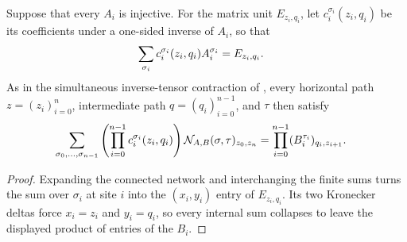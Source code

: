 \begin{lemma}
    \label{lem:mpug_inverse_contraction_open_alternating_network}
    \leanok
    Suppose that every $A_i$ is injective.  For the matrix unit $E_{z_i,q_i}$,
    let $c_i^{\sigma_i}(z_i,q_i)$ be its coefficients under a one-sided
    inverse of $A_i$, so that
    \begin{align}
        \sum_{\sigma_i}c_i^{\sigma_i}(z_i,q_i)A_i^{\sigma_i}
         & =E_{z_i,q_i}.
        \notag
    \end{align}
    As in the simultaneous inverse-tensor contraction of
    \cite[lines~2365--2392]{FrancoRubio2025MPUGauging}, every horizontal path
    $z=(z_i)_{i=0}^{n}$, intermediate path $q=(q_i)_{i=0}^{n-1}$, and $\tau$
    then satisfy
    \begin{align}
        \sum_{\sigma_0,\ldots,\sigma_{n-1}}
        \left(\prod_{i=0}^{n-1}c_i^{\sigma_i}(z_i,q_i)\right)
        \mathcal N_{A,B}(\sigma,\tau)_{z_0,z_n}
         & =\prod_{i=0}^{n-1}(B_i^{\tau_i})_{q_i,z_{i+1}}.
        \notag
    \end{align}
\end{lemma}

\begin{proof}\leanok
    Expanding the connected network and interchanging the finite sums turns the
    sum over $\sigma_i$ at site $i$ into the $(x_i,y_i)$ entry of
    $E_{z_i,q_i}$.  Its two Kronecker deltas force $x_i=z_i$ and $y_i=q_i$, so
    every internal sum collapses to leave the displayed product of entries of
    the $B_i$.
\end{proof}

